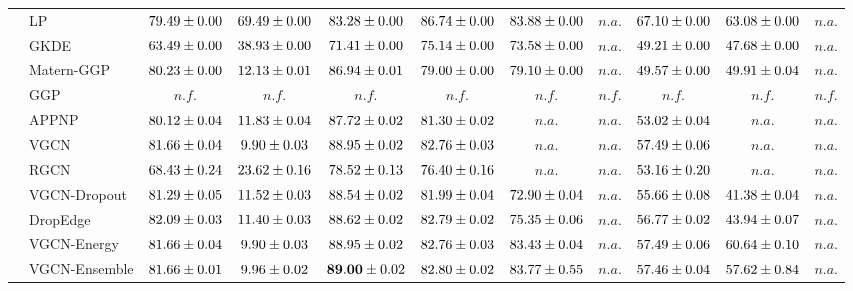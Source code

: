 \begin{table*}[!h]
{\begin{tabular}{ll|cc|cccc|ccc}
        & LP & ${79.49\tiny \pm 0.00}$ & ${69.49\tiny \pm 0.00}$ & ${83.28\tiny \pm 0.00}$ & ${{86.74}\tiny \pm 0.00}$ & ${83.88\tiny \pm 0.00}$ & $n.a.$ & ${{67.10}\tiny \pm 0.00}$ & ${63.08\tiny \pm 0.00}$ & $n.a.$\\
        & GKDE & ${63.49\tiny \pm 0.00}$ & ${38.93\tiny \pm 0.00}$ & ${71.41\tiny \pm 0.00}$ & ${75.14\tiny \pm 0.00}$ & ${73.58\tiny \pm 0.00}$ & $n.a.$ & ${49.21\tiny \pm 0.00}$ & ${47.68\tiny \pm 0.00}$ & $n.a.$\\
        & Matern-GGP & ${80.23\tiny \pm 0.00}$ & ${12.13\tiny \pm 0.01}$ & ${86.94\tiny \pm 0.01}$ & ${79.00\tiny \pm 0.00}$ & ${79.10\tiny \pm 0.00}$ & $n.a.$ & ${49.57\tiny \pm 0.00}$ & ${49.91\tiny \pm 0.04}$ & $n.a.$\\
        & GGP & $n.f.$ & $n.f.$ & $n.f.$ & $n.f.$ & $n.f.$ & $n.f.$ & $n.f.$ & $n.f.$ & $n.f.$\\
        & APPNP & ${80.12\tiny \pm 0.04}$ & ${11.83\tiny \pm 0.04}$ & ${87.72\tiny \pm 0.02}$ & ${81.30\tiny \pm 0.02}$ & $n.a.$ & $n.a.$ & ${53.02\tiny \pm 0.04}$ & $n.a.$ & $n.a.$\\
        & VGCN & ${81.66\tiny \pm 0.04}$ & ${9.90\tiny \pm 0.03}$ & ${88.95\tiny \pm 0.02}$ & ${82.76\tiny \pm 0.03}$ & $n.a.$ & $n.a.$ & ${57.49\tiny \pm 0.06}$ & $n.a.$ & $n.a.$\\
        & RGCN & ${68.43\tiny \pm 0.24}$ & ${23.62\tiny \pm 0.16}$ & ${78.52\tiny \pm 0.13}$ & ${76.40\tiny \pm 0.16}$ & $n.a.$ & $n.a.$ & ${53.16\tiny \pm 0.20}$ & $n.a.$ & $n.a.$\\
        & VGCN-Dropout & ${81.29\tiny \pm 0.05}$ & ${11.52\tiny \pm 0.03}$ & ${88.54\tiny \pm 0.02}$ & ${81.99\tiny \pm 0.04}$ & ${72.90\tiny \pm 0.04}$ & $n.a.$ & ${55.66\tiny \pm 0.08}$ & ${41.38\tiny \pm 0.04}$ & $n.a.$\\
        & DropEdge & ${82.09\tiny \pm 0.03}$ & ${11.40\tiny \pm 0.03}$ & ${88.62\tiny \pm 0.02}$ & ${82.79\tiny \pm 0.02}$ & ${75.35\tiny \pm 0.06}$ & $n.a.$ & ${56.77\tiny \pm 0.02}$ & ${43.94\tiny \pm 0.07}$ & $n.a.$\\
        & VGCN-Energy & ${81.66\tiny \pm 0.04}$ & ${9.90\tiny \pm 0.03}$ & ${88.95\tiny \pm 0.02}$ & ${82.76\tiny \pm 0.03}$ & ${83.43\tiny \pm 0.04}$ & $n.a.$ & ${57.49\tiny \pm 0.06}$ & ${60.64\tiny \pm 0.10}$ & $n.a.$\\
        & VGCN-Ensemble & ${81.66\tiny \pm 0.01}$ & ${9.96\tiny \pm 0.02}$ & ${\mathbf{89.00}\tiny \pm 0.02}$ & ${82.80\tiny \pm 0.02}$ & ${83.77\tiny \pm 0.55}$ & $n.a.$ & ${57.46\tiny \pm 0.04}$ & ${57.62\tiny \pm 0.84}$ & $n.a.$\\

\end{tabular}}
\end{table*}
